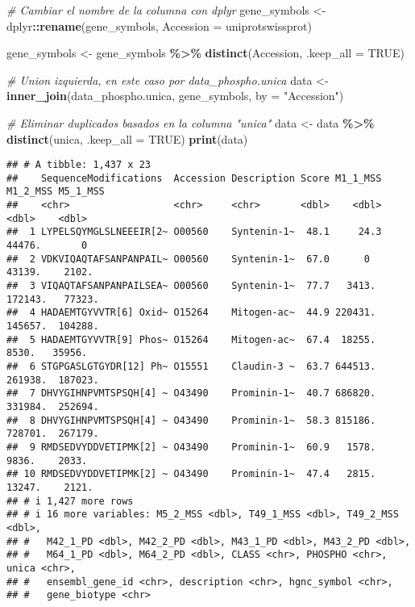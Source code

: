 \documentclass[
]{article}
\newenvironment{Shaded}{\begin{snugshade}}{\end{snugshade}}
\newcommand{\AttributeTok}[1]{\textcolor[rgb]{0.13,0.29,0.53}{#1}}
\newcommand{\CommentTok}[1]{\textcolor[rgb]{0.56,0.35,0.01}{\textit{#1}}}
\newcommand{\ConstantTok}[1]{\textcolor[rgb]{0.56,0.35,0.01}{#1}}
\newcommand{\FunctionTok}[1]{\textcolor[rgb]{0.13,0.29,0.53}{\textbf{#1}}}
\newcommand{\NormalTok}[1]{#1}
\newcommand{\OtherTok}[1]{\textcolor[rgb]{0.56,0.35,0.01}{#1}}
\newcommand{\SpecialCharTok}[1]{\textcolor[rgb]{0.81,0.36,0.00}{\textbf{#1}}}
\newcommand{\StringTok}[1]{\textcolor[rgb]{0.31,0.60,0.02}{#1}}
\begin{document}
\begin{Shaded}
\begin{Highlighting}[]
\CommentTok{\# Cambiar el nombre de la columna con dplyr}
\NormalTok{gene\_symbols }\OtherTok{\textless{}{-}}\NormalTok{ dplyr}\SpecialCharTok{::}\FunctionTok{rename}\NormalTok{(gene\_symbols, }\AttributeTok{Accession =}\NormalTok{ uniprotswissprot)}
\end{Highlighting}
\end{Shaded}

\begin{Shaded}
\begin{Highlighting}[]
\NormalTok{gene\_symbols }\OtherTok{\textless{}{-}}\NormalTok{ gene\_symbols }\SpecialCharTok{\%\textgreater{}\%} \FunctionTok{distinct}\NormalTok{(Accession, }\AttributeTok{.keep\_all =} \ConstantTok{TRUE}\NormalTok{)}

\CommentTok{\# Union izquierda, en este caso por data\_phospho.unica}
\NormalTok{data }\OtherTok{\textless{}{-}} \FunctionTok{inner\_join}\NormalTok{(data\_phospho.unica, gene\_symbols, }\AttributeTok{by =} \StringTok{"Accession"}\NormalTok{)}

\CommentTok{\# Eliminar duplicados basados en la columna "unica"}
\NormalTok{data }\OtherTok{\textless{}{-}}\NormalTok{ data }\SpecialCharTok{\%\textgreater{}\%} \FunctionTok{distinct}\NormalTok{(unica, }\AttributeTok{.keep\_all =} \ConstantTok{TRUE}\NormalTok{)}
\FunctionTok{print}\NormalTok{(data)}
\end{Highlighting}
\end{Shaded}

\begin{verbatim}
## # A tibble: 1,437 x 23
##    SequenceModifications  Accession Description Score M1_1_MSS M1_2_MSS M5_1_MSS
##    <chr>                  <chr>     <chr>       <dbl>    <dbl>    <dbl>    <dbl>
##  1 LYPELSQYMGLSLNEEEIR[2~ O00560    Syntenin-1~  48.1     24.3   44476.       0 
##  2 VDKVIQAQTAFSANPANPAIL~ O00560    Syntenin-1~  67.0      0     43139.    2102.
##  3 VIQAQTAFSANPANPAILSEA~ O00560    Syntenin-1~  77.7   3413.   172143.   77323.
##  4 HADAEMTGYVVTR[6] Oxid~ O15264    Mitogen-ac~  44.9 220431.   145657.  104288.
##  5 HADAEMTGYVVTR[9] Phos~ O15264    Mitogen-ac~  67.4  18255.     8530.   35956.
##  6 STGPGASLGTGYDR[12] Ph~ O15551    Claudin-3 ~  63.7 644513.   261938.  187023.
##  7 DHVYGIHNPVMTSPSQH[4] ~ O43490    Prominin-1~  40.7 686820.   331984.  252694.
##  8 DHVYGIHNPVMTSPSQH[4] ~ O43490    Prominin-1~  58.3 815186.   728701.  267179.
##  9 RMDSEDVYDDVETIPMK[2] ~ O43490    Prominin-1~  60.9   1578.     9836.    2033.
## 10 RMDSEDVYDDVETIPMK[2] ~ O43490    Prominin-1~  47.4   2815.    13247.    2121.
## # i 1,427 more rows
## # i 16 more variables: M5_2_MSS <dbl>, T49_1_MSS <dbl>, T49_2_MSS <dbl>,
## #   M42_1_PD <dbl>, M42_2_PD <dbl>, M43_1_PD <dbl>, M43_2_PD <dbl>,
## #   M64_1_PD <dbl>, M64_2_PD <dbl>, CLASS <chr>, PHOSPHO <chr>, unica <chr>,
## #   ensembl_gene_id <chr>, description <chr>, hgnc_symbol <chr>,
## #   gene_biotype <chr>
\end{verbatim}
\end{document}
